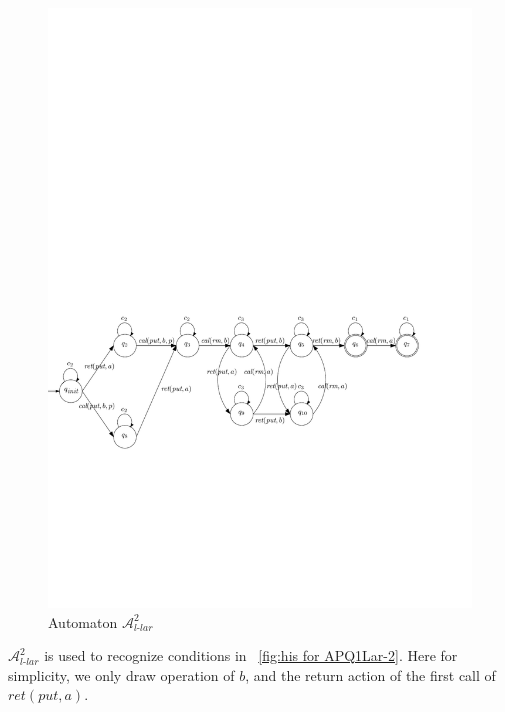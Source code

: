 \begin{figure}[htbp]
  \centering
  \includegraphics[width=1 \textwidth]{figures/PIC_AUTO_PQ1Lar-prpr.pdf}
  \caption{Automaton $\mathcal{A}_{\textit{l-lar}}^2$}
  \label{fig:automata APQ1Lar-2}
\end{figure}


$\mathcal{A}_{\textit{l-lar}}^2$ is used to recognize conditions in \figurename~\ref{fig:his for APQ1Lar-2}. Here for simplicity, we only draw operation of $b$, and the return action of the first call of $\textit{ret}(\textit{put},a)$.


